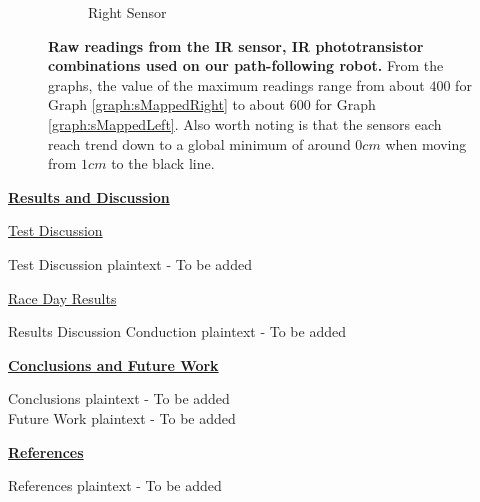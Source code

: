 \documentclass[twocolumn]{article}
\newcommand{\rpm}{\raisebox{.2ex}{$\scriptstyle\pm$}}
\newcommand{\sectionTitle}[1]{ {\large\textbf{\uline{#1}}} \\ \vspace{1.5em} }
\newcommand{\subsectionTitle}[1]{ {\hspace{2em}\uline{#1}} \\ \vspace{1em} }
\newcommand{\textTestDiscussion}{Test Discussion plaintext - To be added}
\newcommand{\textRaceResults}{Results Discussion Conduction plaintext - To be added}
\newcommand{\textConclusions}{Conclusions plaintext - To be added}
\newcommand{\textFutureWork}{Future Work plaintext - To be added}
\newcommand{\textReferences}{References plaintext - To be added}
\begin{document}
\begin{flushleft}
\begin{figure}[!B]
{\begin{subfigure}{\columnwidth}
			\caption{Right Sensor}
			\label{graph:sRawRight}
		\end{subfigure}
		\caption{\textbf{Raw readings from the IR sensor, IR phototransistor combinations used on our path-following robot.} From the graphs, the value of the maximum readings range from about $400$ for Graph \ref{graph:sMappedRight} to about $600$ for Graph \ref{graph:sMappedLeft}. Also worth noting is that the sensors each reach trend down to a global minimum of around $0cm$ when moving from \rpm$1cm$ to the black line.}
	}
	\label{graph:sRaw}
\end{figure}

		\sectionTitle{Results and Discussion}
			
			\subsectionTitle{Test Discussion}

			\textTestDiscussion \\ \vspace{1em}
			
			\subsectionTitle{Race Day Results}

			\textRaceResults \\ \vspace{1em}
			
		\sectionTitle{Conclusions and Future Work}
			
		\textConclusions \\ \vspace{1em}
		\textFutureWork \\ \vspace{1em}
			
		\sectionTitle{References}
			
		\textReferences \\ \vspace{1em}
		\printbibliography

	\end{flushleft}
	
	
\end{document}
